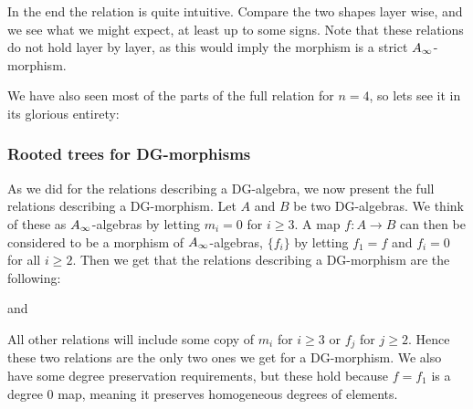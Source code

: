 In the end the relation is quite intuitive. Compare the two shapes layer wise, and we see what we might expect, at least up to some signs. Note that these relations do not hold layer by layer, as this would imply the morphism is a strict $A_{\infty}$-morphism. 

We have also seen most of the parts of the full relation for $n=4$, so lets see it in its glorious entirety:



\subsubsection{Rooted trees for DG-morphisms}
As we did for the relations describing a DG-algebra, we now present the full relations describing a DG-morphism. Let $A$ and $B$ be two DG-algebras. We think of these as $A_{\infty}$-algebras by letting $m_i =0$ for $i\geq 3$. A map $f\colon A\longrightarrow B$ can then be considered to be a morphism of $A_{\infty}$-algebras, $\{f_i\}$ by letting $f_1 = f$ and $f_i = 0$ for all $i\geq 2$. Then we get that the relations describing a DG-morphism are the following:


and 


All other relations will include some copy of $m_i$ for $i\geq 3$ or $f_j$ for $j\geq 2$. Hence these two relations are the only two ones we get for a DG-morphism. We also have some degree preservation requirements, but these hold because $f=f_1$ is a degree $0$ map, meaning it preserves homogeneous degrees of elements. 



